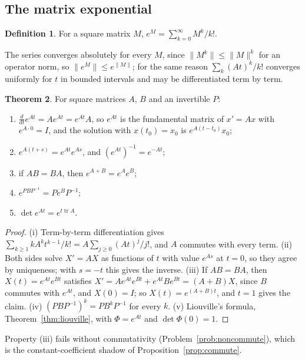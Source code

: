 \documentclass[11pt,a4paper]{article}
\numberwithin{equation}{section}
\DeclareMathOperator{\tr}{tr}
\theoremstyle{definition}
\newtheorem{thm}{Theorem}[subsection]
\newtheorem{defn}[thm]{Definition}
\begin{document}
\subsection{The matrix exponential}
\label{ssec:expm}

\begin{defn}
For a square matrix $M$, $e^M = \sum_{k=0}^\infty M^k/k!$.
\end{defn}

The series converges absolutely for every $M$, since $\|M^k\| \leq \|M\|^k$ for an operator norm, so $\|e^M\| \leq e^{\|M\|}$; for the same reason $\sum_k(At)^k/k!$ converges uniformly for $t$ in
bounded intervals and may be differentiated term by term.

\begin{thm}
\label{thm:expprops}
For square matrices $A$, $B$ and an invertible $P$:
\begin{enumerate}[label=(\roman*)]
\item $\frac{d}{dt}e^{At} = Ae^{At} = e^{At}A$, so $e^{At}$ is the fundamental matrix of $x' = Ax$ with $e^{A\cdot0} = I$, and the solution with $x(t_0) = x_0$ is $e^{A(t - t_0)}x_0$;
\item $e^{A(t+s)} = e^{At}e^{As}$, and $(e^{At})^{-1} = e^{-At}$;
\item if $AB = BA$, then $e^{A+B} = e^Ae^B$;
\item $e^{PBP^{-1}} = Pe^BP^{-1}$;
\item $\det e^{At} = e^{t\tr A}$.
\end{enumerate}
\end{thm}

\begin{proof}
(i) Term-by-term differentiation gives $\sum_{k\geq1}kA^kt^{k-1}/k! = A\sum_{j\geq0}(At)^j/j!$, and $A$ commutes with every term. (ii) Both sides solve $X' = AX$ as functions of $t$ with value $e^{As}$
at $t = 0$, so they agree by uniqueness; with $s = -t$ this gives the inverse. (iii) If $AB = BA$, then $X(t) = e^{At}e^{Bt}$ satisfies $X' = Ae^{At}e^{Bt} + e^{At}Be^{Bt} = (A + B)X$, since $B$
commutes with $e^{At}$, and $X(0) = I$; so $X(t) = e^{(A+B)t}$, and $t = 1$ gives the claim. (iv) $(PBP^{-1})^k = PB^kP^{-1}$ for every $k$. (v) Liouville's formula, Theorem~\ref{thm:liouville}, with
$\Phi = e^{At}$ and $\det\Phi(0) = 1$.
\end{proof}

Property (iii) fails without commutativity (Problem~\ref{prob:noncommute}), which is the constant-coefficient shadow of Proposition~\ref{prop:commute}.
\end{document}
